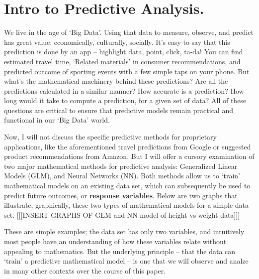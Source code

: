 \documentclass[12pt]{article}
\begin{document}
	\section{Intro to Predictive Analysis.}
		We live in the age of `Big Data'.  Using that data to measure, observe, and predict has great value:  economically, culturally, 
socially.  It's easy to say that this prediction is done by an app -- highlight data, point, click, ta-da!  You can find \href{https://www.google.com/maps/dir/Chicago,+Illinois/Champagne+Beach,+Vanuatu/@10.9584518,-169.5679877,3z/data=!4m13!4m12!1m5!1m1!1s0x880e2c3cd0f4cbed:0xafe0a6ad09c0c000!2m2!1d-87.6297982!2d41.8781136!1m5!1m1!1s0x6ef24c13ce5a7303:0x5807cbc94589a4bb!2m2!1d167.1203814!2d-15.1437919}{estimated travel time}, 
\href{https://www.amazon.com/Statistics-Dummies-Math-Science/dp/1119293529/ref=sr_1_1?ie=UTF8&qid=1518456852&sr=8-1&keywords=statistics+for+dummies+2017}{`Related materials' in consumer recommendations}, and \href{http://www.espn.com/mens-college-basketball/game?gameId=400986579}{predicted outcome of sporting events} with a few simple taps on your 
phone.  But what's the mathematical machinery behind these predictions?  Are all the predictions calculated in a similar manner?  How accurate is a
prediction?  How long would it take to compute a prediction, for a given set of data?  All of these questions are critical to ensure that predictive models 
remain practical and functional in our `Big Data' world.

Now, I will not discuss the specific predictive methods for proprietary applications, like the aforementioned travel predictions from Google or 
suggested product recommendations from Amazon.  But I will offer a cursory examination of two major mathematical methods for predictive analysis:
Generalized Linear Models (GLM), and Neural Networks (NN).  Both methods allow us to `train' mathematical models on an existing data set, which can
subsequently be used to predict future outcomes, or \textbf{response variables}.  Below are two graphs that illustrate, graphically, these two
types of mathematical models for a simple data set.  [[[INSERT GRAPHS OF GLM and NN model of height vs weight data]]]


These are simple examples; the data set has only two variables, and intuitively most people have an understanding of how these variables relate 
without appealing to mathematics.  But the underlying principle -- that the data can `train' a predictive mathematical model -- is one that we will
observe and analze in many other contexts over the course of this paper.
\end{document}
